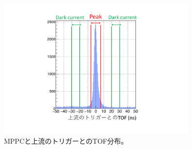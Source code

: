 \begin{figure}
  \centering
  \includegraphics[width=10cm]{images/chapter3/TOF.pdf}
  \caption{MPPCと上流のトリガーとのTOF分布。}
  \label{fig:TOF}
\end{figure}


